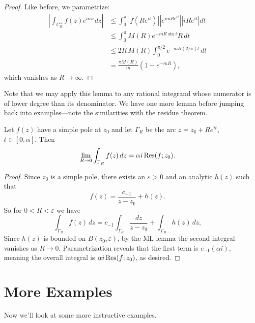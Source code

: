 \documentclass[../m136main.tex]{subfiles}
\begin{document}
\begin{proof}
    Like before, we parametrize:
    \begin{align*}
        \left| \int_{C_R^+} f(z) e^{imz} dz \right| &\leq \int_{0}^{\pi} |f(Re^{it})| |e^{im R e^{it}}| |i R e^{it}| dt \\
        &\leq \int_{0}^{\pi} M(R) e^{-m R \sin t} R \,dt \\
        &\leq 2 R \, M(R) \int_{0}^{\pi / 2} e^{-mR(2 / \pi) t} \,dt \\
        &= \frac{\pi M(R)}{m} (1 - e^{-mR}),
    \end{align*}
    which vanishes as $R \to \infty$.
\end{proof}

Note that we may apply this lemma to any rational integrand whose numerator is of lower degree than its denominator.
We have one more lemma before jumping back into examples---note the similarities with the residue theorem.

\begin{lemma}[]
    Let $f(z)$ have a simple pole at $z_0$ and let $\Gamma_R$ be the arc $z = z_0 + R e^{it}$, $t \in [0, \alpha]$.
    Then
    \[ \lim_{R \to 0} \int_{\Gamma_R} f(z) \,dz = \alpha i \operatorname{Res}(f; z_0). \]
\end{lemma}

\begin{proof}
    Since $z_0$ is a simple pole, there exists an $\varepsilon > 0$ and an analytic $h(z)$ such that
    \[ f(z) = \frac{c_{-1}}{z - z_0} + h(z). \]
    So for $0 < R < \varepsilon$ we have
    \[ \int_{\Gamma_R} f(z) \,dz = c_{-1} \int_{\Gamma_R} \frac{dz}{z - z_0} + \int_{\Gamma_R} h(z) \,dz, \]
    Since $h(z)$ is bounded on $B(z_0, \varepsilon)$, by the ML lemma the second integral vanishes as $R \to 0$.
    Parametrization reveals that the first term is $c_{-1}(\alpha i)$, meaning the overall integral is $\alpha i \operatorname{Res}(f; z_0)$, as desired.
\end{proof}

\pagebreak

\section{More Examples}
Now we'll look at some more instructive examples.
\end{document}
